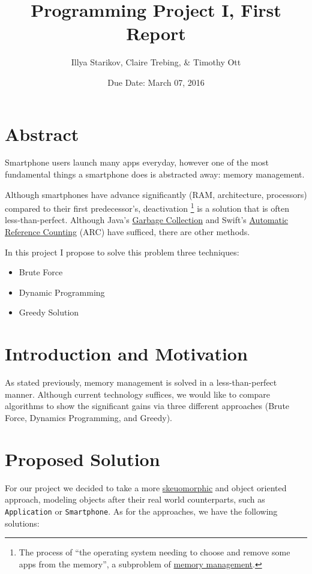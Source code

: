 \documentclass{article}
\title{Programming Project I, First Report}
\author{Illya Starikov, Claire Trebing, \& Timothy Ott}
\date{Due Date: March 07, 2016}
\begin{document}
\maketitle

\section{Abstract}
Smartphone users launch many apps everyday, however one of the most fundamental things a smartphone does is abstracted away: memory management.

Although smartphones have advance significantly (RAM, architecture, processors) compared to their first predecessor's, deactivation \footnote{The process of ``the operating system needing to choose and remove some apps from the memory'', a subproblem of \href{https://en.wikipedia.org/wiki/Memory_management}{memory management}.} is a solution that is often less-than-perfect. Although Java's \href{http://www.oracle.com/webfolder/technetwork/tutorials/obe/java/gc01/index.html}{Garbage Collection} and Swift's \href{https://developer.apple.com/library/ios/documentation/Swift/Conceptual/Swift_Programming_Language/AutomaticReferenceCounting.html}{Automatic Reference Counting} (ARC) have sufficed, there are other methods.

In this project I propose to solve this problem three techniques:

\begin{itemize}
    \item Brute Force
    \item Dynamic Programming
    \item Greedy Solution
\end{itemize}

\section{Introduction and Motivation}
As stated previously, memory management is solved in a less-than-perfect manner. Although current technology suffices, we would like to compare algorithms to show the significant gains via three different approaches (Brute Force, Dynamics Programming, and Greedy).

\section{Proposed Solution}
For our project we decided to take a more \href{https://en.wikipedia.org/wiki/Skeuomorph}{skeuomorphic} and object oriented approach, modeling objects after their real world counterparts, such as \texttt{Application} or \texttt{Smartphone}. As for the approaches, we have the following solutions:
\end{document}
